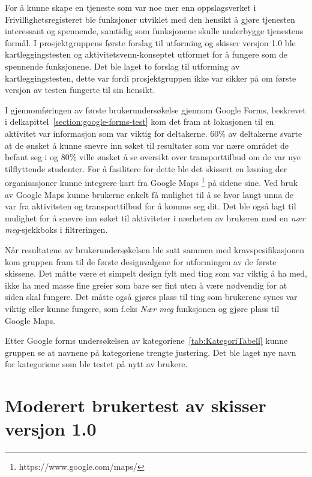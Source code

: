 For å kunne skape en tjeneste som var noe mer enn oppslagsverket i Frivillighetsregisteret ble funksjoner utviklet med den hensikt å gjøre tjenesten interessant og spennende, samtidig som funksjonene skulle underbygge tjenestens formål. I prosjektgruppens første forslag til utforming og skisser versjon 1.0 ble kartleggingstesten og aktivitetsvenn-konseptet utformet for å fungere som de spennende funksjonene. Det ble laget to forslag til utforming av kartleggingstesten, dette var fordi prosjektgruppen ikke var sikker på om første versjon av testen fungerte til sin hensikt.

I gjennomføringen av første brukerundersøkelse gjennom Google Forms, beskrevet i delkapittel~\ref{section:google-forms-test} kom det fram at lokasjonen til en aktivitet var informasjon som var viktig for deltakerne. 60\% av deltakerne svarte at de ønsket å kunne snevre inn søket til resultater som var nære området de befant seg i og 80\% ville ønsket å se oversikt over transporttilbud om de var nye tilflyttende studenter. For å fasilitere for dette ble det skissert en løsning der organisasjoner kunne integrere kart fra Google Maps \footnote{https://www.google.com/maps/} på sidene sine. Ved bruk av Google Maps kunne brukerne enkelt få mulighet til å se hvor langt unna de var fra aktiviteten og transporttilbud for å komme seg dit. Det ble også lagt til mulighet for å snevre inn søket til aktiviteter i nærheten av brukeren med en {\em  nær meg}-sjekkboks i filtreringen.

Når resultatene av brukerundersøkelsen ble satt sammen med kravspesifikasjonen kom gruppen fram til de første designvalgene for utformingen av de første skissene.
Det måtte være et simpelt design fylt med ting som var viktig å ha med, ikke ha med masse fine greier som bare ser fint uten å være nødvendig for at siden skal fungere. Det måtte også gjøres plass til ting som brukerene synes var viktig eller kunne fungere, som f.eks {\em Nær meg} funksjonen og gjøre plass til Google Maps.

Etter Google forms undersøkelsen av kategoriene~\ref{tab:KategoriTabell} kunne gruppen se at navnene på kategoriene trengte justering. Det ble laget nye navn for kategoriene som ble testet på nytt av brukere. 

\section{Moderert brukertest av skisser versjon 1.0}
\label{section:Moderert brukertest-skisser-1}

